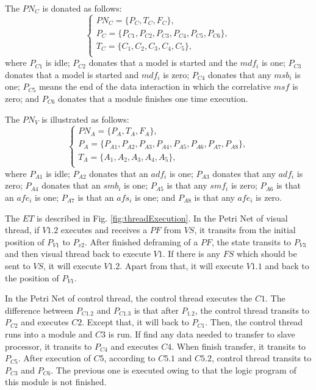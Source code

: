 \documentclass[journal,UTF8]{IEEEtran}
\begin{document}
The $PN_C$ is donated as follows:
\begin{equation}
\left\{
\begin{array}{l}
PN_C= \{P_C,T_C,F_C\},\\
P_C=\{P_{C1}, P_{C2}, P_{C3}, P_{C4}, P_{C5}, P_{C6}\},\\
T_C=\{C_1,C_2,C_3,C_4,C_5\},\\
\end{array}
\right.
\end{equation} 
where $P_{C1}$ is idle; $P_{C2}$ donates that a model is started and the $mdf_i$ is one; $P_{C3}$ donates that a model is started and $mdf_i$ is zero; $P_{C4}$ donates that any $msb_i$ is one; $P_{C5}$ means the end of the data interaction in which the  correlative $msf$ is zero; and $P_{C6}$ donates that a module finishes one time execution.

The $PN_V$ is illustrated as follows:
\begin{equation}
\left\{
\begin{array}{l}
PN_A= \{P_A,T_A,F_A\},\\
P_A=\{P_{A1}, P_{A2}, P_{A3}, P_{A4}, P_{A5}, P_{A6}, P_{A7}, P_{A8}\},\\
T_A=\{A_1,A_2,A_3,A_4,A_5\},\\
\end{array}
\right.
\end{equation} 
where $P_{A1}$ is idle; $P_{A2}$ donates that an $adf_i$ is one; $P_{A3}$ donates that any $adf_i$ is zero; $P_{A4}$ donates that an $smb_i$ is one; $P_{A5}$ is that any $smf_i$ is zero; $P_{A6}$ is that an $afe_i$ is one; $P_{A7}$ is that an $afs_i$ is one; and $P_{A8}$ is that any $afe_i$ is zero.   

The $ET$ is described in Fig. \ref{fig:threadExecution}. In the Petri Net of visual thread, if $V1.2$ executes and receives a $PF$ from $VS$, it transits from the initial position of $P_{V1}$ to $P_{v2}$. After finished deframing of a $PF$, the state transits to $P_{V3}$ and then visual thread back to execute $V1$. If there is any $FS$ which should be sent to $VS$, it will execute $V1.2$. Apart from that, it will execute $V1.1$ and back to the position of $P_{V1}$.

In the Petri Net of control thread, the control thread executes the $C1$. The difference between $P_{C1.2}$ and $P_{C1.3}$ is that after $P_{1.2}$, the control thread transits to $P_{C2}$ and executes $C2$. Except that, it will back to $P_{C1}$. Then, the control thread runs into a module and $C3$ is run. If find any data needed to transfer to slave processor, it transits to $P_{C4}$ and executes $C4$. When finish transfer, it transits to $P_{C5}$. After execution of $C5$, according to $C5.1$ and $C5.2$, control thread transits to $P_{C3}$ and $P_{C6}$. The previous one is executed owing to that the logic program of this module is not finished.
\end{document}
